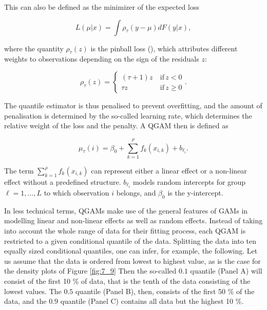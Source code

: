 This can also be defined as the minimizer of the expected loss

\begin{equation}
\label{eq:Lmux}
    L(\mu|x)=\int \rho_{\tau}(y-\mu)dF(y|x),
\end{equation}

where the quantity $\rho_{\tau}(z)$ is the pinball loss (\cite{Koenker2005, Gneiting2011}), which attributes different weights to observations depending on the sign of the residuals $z$:

\begin{equation}
\label{eq:rhotauz}
    \rho_{\tau}(z)=\left \{ \begin{matrix}
    (\tau+1)z\ & \mathrm{if}\, z<0\\ 
    \tau z & \mathrm{if} \, z\geq 0
    \end{matrix} \right..
\end{equation}

The quantile estimator is thus penalised to prevent overfitting, and the amount of penalisation is determined by the so-called learning rate, which determines the relative weight of the loss and the penalty. A QGAM then is defined as

\begin{equation}
\label{eq:mutaui}
    \mu_{\tau}(i)=\beta_{0}+\sum_{k=1}^{\rho}f_{k}(x_{i,k})+b_{\ell_{i}}.
\end{equation}

The term $\sum_{k=1}^{\rho}f_{k}(x_{i,k})$ can represent either a linear effect or a non-linear effect without a predefined structure. $b_{\ell_{i}}$ models random intercepts for group $\ell=1,...,L$ to which observation $i$ belongs, and $\beta_{0}$ is the y-intercept.

In less technical terms, QGAMs make use of the general features of GAMs in modelling linear and non-linear effects as well as random effects. Instead of taking into account the whole range of data for their fitting process, each QGAM is restricted to a given conditional quantile of the data. Splitting the data into ten equally sized conditional quantiles, one can infer, for example, the following. Let us assume that the data is ordered from lowest to highest value, as is the case for the density plots of Figure \ref{fig:7_9} Then the so-called $0.1$ quantile (Panel A) will consist of the first 10 \% of data, that is the tenth of the data consisting of the lowest values. The $0.5$ quantile (Panel B), then, consists of the first 50 \% of the data, and the $0.9$ quantile (Panel C) contains all data but the highest 10 \%. 


